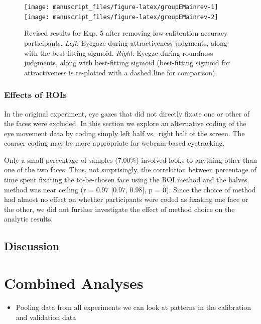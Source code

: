 \documentclass[
  man,floatsintext]{apa6}
\providecommand{\tightlist}{%
  \setlength{\itemsep}{0pt}\setlength{\parskip}{0pt}}
\begin{document}
\begin{figure}
\texttt{[image: manuscript\_files/figure-latex/groupEMainrev-1]} \texttt{[image: manuscript\_files/figure-latex/groupEMainrev-2]} \caption{Revised results for Exp. 5 after removing low-calibration accuracy participants. \emph{Left}: Eyegaze during attractiveness judgments, along with the best-fitting sigmoid. \emph{Right}: Eyegze during roundness judgments, along with best-fitting sigmoid (best-fitting sigmoid for attractiveness is re-plotted with a dashed line for comparison).}\label{fig:groupEMainrev}
\end{figure}

\hypertarget{effects-of-rois-2}{%
\subsubsection{Effects of ROIs}\label{effects-of-rois-2}}

In the original experiment, eye gazes that did not directly fixate one or other of the faces were excluded. In this section we explore an alternative coding of the eye movement data by coding simply left half vs.~right half of the screen. The coarser coding may be more appropriate for webcam-based eyetracking.

Only a small percentage of samples (7.00\%) involved looks to anything other than one of the two faces. Thus, not surprisingly, the correlation between percentage of time spent fixating the to-be-chosen face using the ROI method and the halves method was near ceiling (r = 0.97 {[}0.97, 0.98{]}, p = 0). Since the choice of method had almost no effect on whether participants were coded as fixating one face or the other, we did not further investigate the effect of method choice on the analytic results.

\hypertarget{discussion-4}{%
\subsection{Discussion}\label{discussion-4}}

\hypertarget{combined-analyses}{%
\section{Combined Analyses}\label{combined-analyses}}

\begin{itemize}
\tightlist
\item
  Pooling data from all experiments we can look at patterns in the
  calibration and validation data
\end{itemize}
\end{document}
